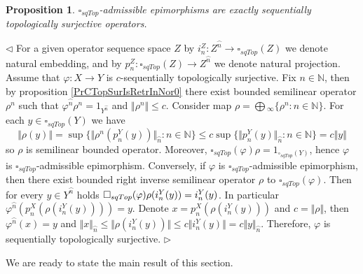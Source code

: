 \documentclass[12pt]{article}
\newtheorem{proposition}[theorem]{Proposition}
\newenvironment{proof}{\par $\triangleleft$}{$\triangleright$}
\begin{document}
\begin{proposition}\label{PrDecsTopAdmEpiMorph} $\square_{sqTop}$-admissible epimorphisms are exactly sequentially topologically surjective operators.
\end{proposition}
\begin{proof}
For a given operator sequence space $Z$ by $i_n^Z:Z^{\wideparen{n}}\to\square_{sqTop}(Z)$ we denote natural embedding, and by $p_n^Z:\square_{sqTop}(Z)\to Z^{\wideparen{n}}$ we denote natural projection. Assume that $\varphi:X\to Y$ is $c$-sequentially topologically surjective. Fix $n\in\mathbb{N}$, then by proposition \ref{PrCTopSurIsRetrInNor0} there exist bounded semilinear operator $\rho^n$ such that $\varphi^{\wideparen{n}}\rho^n=1_{Y^{\wideparen{n}}}$ and $\Vert\rho^n\Vert\leq c$. Consider map $ \rho=\bigoplus{}_\infty\{\rho^n:n\in\mathbb{N}\}$. For each $y\in \square_{sqTop}(Y)$ we have 
$$
\Vert \rho(y)\Vert=\sup\{\Vert\rho^n(p_n^Y(y))\Vert_{\wideparen{n}}: n\in\mathbb{N}\}\leq
c\sup\{\Vert p_n^Y(y)\Vert_{\wideparen{n}}: n\in\mathbb{N}\}=c\Vert y\Vert
$$
so $\rho$ is semilinear bounded operator. Moreover, $\square_{sqTop}(\varphi)\rho=1_{\square_{sqTop}(Y)}$, hence $\varphi$ is $\square_{sqTop}$-admissible epimorphism. Conversely, if 
$\varphi$ is $\square_{sqTop}$-admissible epimorphism, then there exist bounded right inverse semilinear operator $\rho$ to $\square_{sqTop}(\varphi)$. Then for every $y\in Y^{\wideparen{n}}$ holds $\square_{sqTop}(\varphi)\\\rho(i_n^Y(y))=i_n^Y(y)$. In particular $\varphi^{\wideparen{n}}(p_n^X(\rho(i_n^Y(y))))=y$. Denote $x=p_n^X(\rho(i_n^Y(y)))$ and 
$c=\Vert\rho\Vert$, then $\varphi^{\wideparen{n}}(x)=y$ and $\Vert x\Vert_{\wideparen{n}}\leq\Vert\rho(i_n^Y(y))\Vert\leq c\Vert i_n^Y(y)\Vert=c\Vert y\Vert_{\wideparen{n}}$. Therefore, 
$\varphi$ is sequentially topologically surjective.
\end{proof}

We are ready to state the main result of this section.
\end{document}
